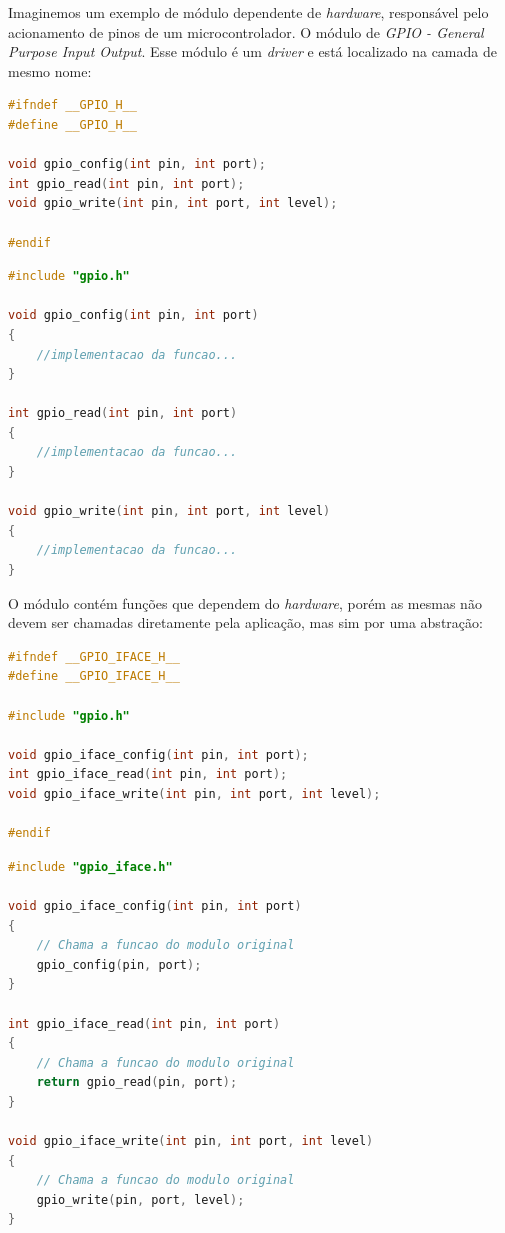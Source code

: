 \documentclass[times, twoside, watermark]{artigo}
\begin{document}
Imaginemos um exemplo de módulo dependente de \textit{hardware},
responsável pelo acionamento de pinos de um microcontrolador. O módulo de 
\textit{GPIO - General Purpose Input Output}. Esse módulo é um \textit{driver} e está 
localizado na camada de mesmo nome:

\begin{lstlisting}[language=C, caption=Interface do módulo de GPIO - gpio.h]
#ifndef __GPIO_H__
#define __GPIO_H__

void gpio_config(int pin, int port);
int gpio_read(int pin, int port);
void gpio_write(int pin, int port, int level);

#endif
\end{lstlisting}


\begin{lstlisting}[language=C, caption=Implementação do módulo de GPIO - gpio.c]
#include "gpio.h"

void gpio_config(int pin, int port)
{
    //implementacao da funcao...
}

int gpio_read(int pin, int port)
{
    //implementacao da funcao...
}

void gpio_write(int pin, int port, int level)
{
    //implementacao da funcao...
}
\end{lstlisting}

O módulo contém funções que dependem do \textit{hardware}, porém as mesmas não 
devem ser chamadas diretamente pela aplicação, mas sim por uma abstração:

\begin{lstlisting}[language=C, caption=Interface pública do módulo - gpio\_iface.h]
#ifndef __GPIO_IFACE_H__
#define __GPIO_IFACE_H__

#include "gpio.h"

void gpio_iface_config(int pin, int port);
int gpio_iface_read(int pin, int port);
void gpio_iface_write(int pin, int port, int level);

#endif
\end{lstlisting}


\begin{lstlisting}[language=C, caption=Implementação da abstração para acesso ao 
módulo de GPIO - gpio\_iface.c]
#include "gpio_iface.h"

void gpio_iface_config(int pin, int port)
{
    // Chama a funcao do modulo original
    gpio_config(pin, port);
}

int gpio_iface_read(int pin, int port)
{
    // Chama a funcao do modulo original
    return gpio_read(pin, port);
}

void gpio_iface_write(int pin, int port, int level)
{
    // Chama a funcao do modulo original
    gpio_write(pin, port, level);
}
\end{lstlisting}
\end{document}
